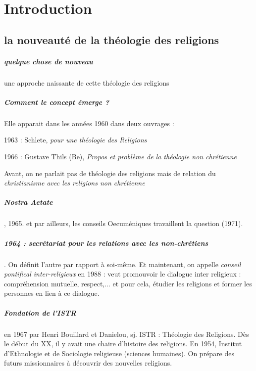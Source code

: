 \chapter{Introduction}


\section{la nouveauté de la théologie des religions}
\paragraph{quelque chose de nouveau} une approche naissante de cette théologie des religions

\paragraph{Comment le concept émerge ?} Elle apparait dans les années 1960 dans deux ouvrages : 
\bi 
\item 1963 : Schlete, \textit{pour une théologie des Religions}
\item 1966 : Gustave Thils (Be), \textit{Propos et problème de la théologie non chrétienne} 

\ei 
Avant, on ne parlait pas de théologie des religions mais de relation du \textit{christianisme avec les religions non chrétienne}

\paragraph{Nostra Aetate}, 1965. et par ailleurs, les conseils Oecuméniques travaillent la question (1971).
\paragraph{1964 : secrétariat pour les relations avec les non-chrétiens}. On définit l'autre par rapport à soi-même. Et maintenant, on appelle \textit{conseil pontifical inter-religieux} en 1988 : veut promouvoir le dialogue inter religieux : compréhension mutuelle, respect,... et pour cela, étudier les religions et former les personnes en lien à ce dialogue.

\paragraph{Fondation de l'ISTR} en 1967 par Henri Bouillard et Danielou, sj. ISTR : Théologie des Religions. Dès le début du XX, il y avait une chaire d'histoire des religions. En 1954, Institut d'Ethnologie et de Sociologie religieuse (sciences humaines). On prépare des futurs missionnaires à découvrir des nouvelles religions. 

